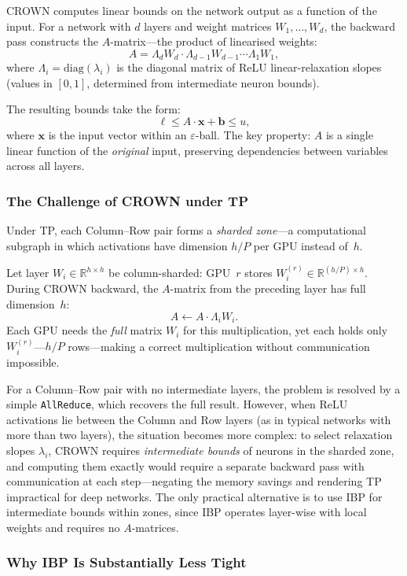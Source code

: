 CROWN computes linear bounds on the network output as a function of the input.
For a network with $d$ layers and weight matrices $W_1, \ldots, W_d$, the
backward pass constructs the $A$-matrix---the product of linearised weights:
$$A = \Lambda_d W_d \cdot \Lambda_{d-1} W_{d-1} \cdots \Lambda_1 W_1,$$
where $\Lambda_i = \mathrm{diag}(\lambda_i)$ is the diagonal matrix of
ReLU linear-relaxation slopes (values in $[0, 1]$, determined from intermediate
neuron bounds).

The resulting bounds take the form:
$$\ell \leq A \cdot \mathbf{x} + \mathbf{b} \leq u,$$
where $\mathbf{x}$ is the input vector within an $\varepsilon$-ball.
The key property: $A$ is a single linear function of the \textit{original}
input, preserving dependencies between variables across all layers.

\subsubsection{The Challenge of CROWN under TP}

Under TP, each Column--Row pair forms a \textit{sharded zone}---a computational
subgraph in which activations have dimension $h/P$ per GPU instead of~$h$.

Let layer $W_i \in \mathbb{R}^{h \times h}$ be column-sharded: GPU~$r$ stores
$W_i^{(r)} \in \mathbb{R}^{(h/P) \times h}$. During CROWN backward, the
$A$-matrix from the preceding layer has full dimension~$h$:
$$A \leftarrow A \cdot \Lambda_i W_i.$$
Each GPU needs the \textit{full} matrix $W_i$ for this multiplication, yet
each holds only $W_i^{(r)}$---$h/P$ rows---making a correct multiplication
without communication impossible.

For a Column--Row pair with no intermediate layers, the problem is resolved by
a simple \texttt{AllReduce}, which recovers the full result. However, when ReLU
activations lie between the Column and Row layers (as in typical networks with
more than two layers), the situation becomes more complex: to select
relaxation slopes $\lambda_i$, CROWN requires \textit{intermediate bounds}
of neurons in the sharded zone, and computing them exactly would require a
separate backward pass with communication at each step---negating the memory
savings and rendering TP impractical for deep networks. The only practical
alternative is to use IBP for intermediate bounds within zones, since IBP
operates layer-wise with local weights and requires no $A$-matrices.

\subsubsection{Why IBP Is Substantially Less Tight}


